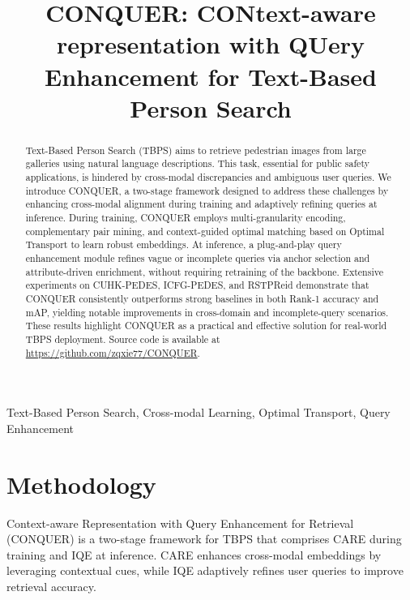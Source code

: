 \documentclass{article}
\title{CONQUER: CONtext-aware representation with QUery Enhancement for Text-Based Person Search}
\begin{document}
\ninept
%
\maketitle
%
\begin{abstract}
Text-Based Person Search (TBPS) aims to retrieve pedestrian images from large galleries using natural language descriptions. This task, essential for public safety applications, is hindered by cross-modal discrepancies and ambiguous user queries. We introduce CONQUER, a two-stage framework designed to address these challenges by enhancing cross-modal alignment during training and adaptively refining queries at inference. During training, CONQUER employs multi-granularity encoding, complementary pair mining, and context-guided optimal matching based on Optimal Transport to learn robust embeddings. At inference, a plug-and-play query enhancement module refines vague or incomplete queries via anchor selection and attribute-driven enrichment, without requiring retraining of the backbone. Extensive experiments on CUHK-PEDES, ICFG-PEDES, and RSTPReid demonstrate that CONQUER consistently outperforms strong baselines in both Rank-1 accuracy and mAP, yielding notable improvements in cross-domain and incomplete-query scenarios. These results highlight CONQUER as a practical and effective solution for real-world TBPS deployment. Source code is available at \url{https://github.com/zqxie77/CONQUER}.

\end{abstract}
%
\begin{keywords}
\normalfont Text-Based Person Search, Cross-modal Learning, Optimal Transport, Query Enhancement
\end{keywords}
%






 


\section{Methodology}

Context-aware Representation with Query Enhancement for Retrieval (CONQUER) is a two-stage framework for TBPS that comprises CARE during training and IQE at inference. CARE enhances cross-modal embeddings by leveraging contextual cues, while IQE adaptively refines user queries to improve retrieval accuracy.
\end{document}
